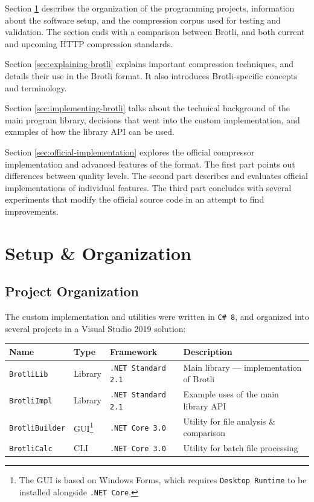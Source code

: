 \documentclass[english,master,dept460,male,cpp,cpdeclaration]{diploma}
\begin{document}
Section \ref{sec:setup-and-organization} describes the organization of the programming projects, information about the software setup, and the compression corpus used for testing and validation. The section ends with a comparison between Brotli, and both current and upcoming HTTP compression standards.

Section \ref{sec:explaining-brotli} explains important compression techniques, and details their use in the Brotli format. It also introduces Brotli-specific concepts and terminology.

Section \ref{sec:implementing-brotli} talks about the technical background of the main program library, decisions that went into the custom implementation, and examples of how the library API can be used.

Section \ref{sec:official-implementation} explores the official compressor implementation and advanced features of the format. The first part points out differences between quality levels. The second part describes and evaluates official implementations of individual features. The third part concludes with several experiments that modify the official source code in an attempt to find improvements.

\section{Setup \& Organization}
\label{sec:setup-and-organization}
	
	\subsection{Project Organization}
	
	The custom implementation and utilities were written in \verb|C# 8|, and organized into several projects in a Visual Studio 2019 solution:
	
	\bigskip
	\noindent
	\begin{tabularx}{\textwidth}{ l | l | l | X }
	Name & Type & Framework & Description \\
	\hline
	\verb|Brotli|\hspace{2.5pt}\verb|Lib| & Library & \verb|.NET Standard 2.1| & Main library --- implementation of Brotli \\
	\verb|Brotli|\hspace{2.5pt}\verb|Impl| & Library & \verb|.NET Standard 2.1| & Example uses of the main library API \\
	\verb|Brotli|\hspace{2.5pt}\verb|Builder| & GUI\footnote{The GUI is based on Windows Forms, which requires \verb|Desktop Runtime| to be installed alongside \verb|.NET Core|.} & \verb|.NET Core 3.0| & Utility for file analysis \& comparison \\
	\verb|Brotli|\hspace{2.5pt}\verb|Calc| & CLI & \verb|.NET Core 3.0| & Utility for batch file processing \\
	\end{tabularx}
	
\end{document}
